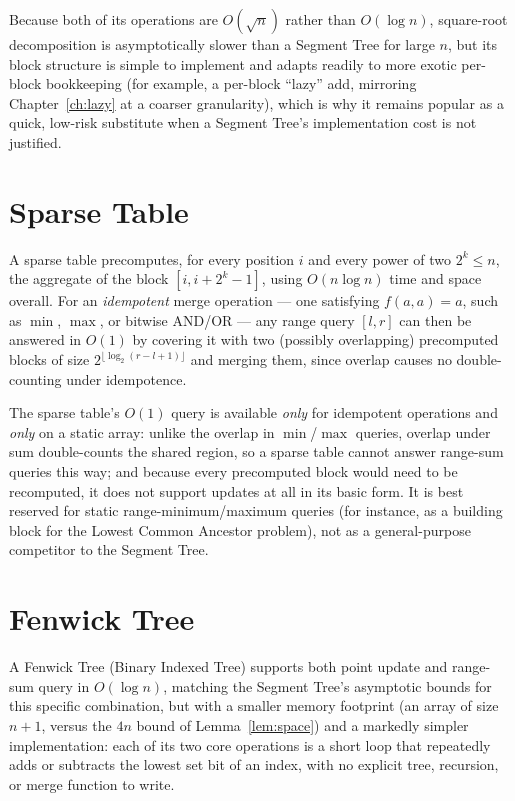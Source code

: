 \documentclass[
  11pt,
  a4paper,
  twoside=false,
  numbers=noenddot,
  headings=big,
  parskip=half,
  toc=bibliography,
  toc=listof,
  bibliography=totoc
]{scrreprt}
\newcounter{example}[chapter]
\newcommand{\Oh}[1]{O\!\left(#1\right)}
\begin{document}
Because both of its operations are $\Oh{\sqrt n}$ rather than $\Oh{\log n}$, square-root decomposition is asymptotically slower than a Segment Tree for large $n$, but its block structure is simple to implement and adapts readily to more exotic per-block bookkeeping (for example, a per-block ``lazy'' add, mirroring Chapter~\ref{ch:lazy} at a coarser granularity), which is why it remains popular as a quick, low-risk substitute when a Segment Tree's implementation cost is not justified.

\section{Sparse Table}
\label{sec:sparsetable}
A sparse table precomputes, for every position $i$ and every power of two $2^{k}\le n$, the aggregate of the block $[i,i+2^{k}-1]$, using $\Oh{n\log n}$ time and space overall\cite{cpalgorithms-sparse}. For an \emph{idempotent} merge operation --- one satisfying $f(a,a)=a$, such as $\min$, $\max$, or bitwise $\mathrm{AND}$/$\mathrm{OR}$ --- any range query $[l,r]$ can then be answered in $\Oh{1}$ by covering it with two (possibly overlapping) precomputed blocks of size $2^{\lfloor\log_2(r-l+1)\rfloor}$ and merging them, since overlap causes no double-counting under idempotence.

\begin{pitfall}
The sparse table's $\Oh{1}$ query is available \emph{only} for idempotent operations and \emph{only} on a static array: unlike the overlap in $\min$/$\max$ queries, overlap under sum double-counts the shared region, so a sparse table cannot answer range-sum queries this way; and because every precomputed block would need to be recomputed, it does not support updates at all in its basic form. It is best reserved for static range-minimum/maximum queries (for instance, as a building block for the Lowest Common Ancestor problem), not as a general-purpose competitor to the Segment Tree.
\end{pitfall}

\section{Fenwick Tree}
\label{sec:fenwick}
A Fenwick Tree (Binary Indexed Tree) supports both point update and range-sum query in $\Oh{\log n}$, matching the Segment Tree's asymptotic bounds for this specific combination, but with a smaller memory footprint\cite{fenwick,cpalgorithms-fenwick} (an array of size $n{+}1$, versus the $4n$ bound of Lemma~\ref{lem:space}) and a markedly simpler implementation: each of its two core operations is a short loop that repeatedly adds or subtracts the lowest set bit of an index, with no explicit tree, recursion, or merge function to write.
\end{document}
